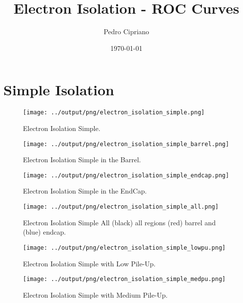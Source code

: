 \documentclass[11pt]{book}
\begin{document}
         
 
 \author{Pedro Cipriano}
 \date{\today}
 \title{Electron Isolation - ROC Curves}

\maketitle

\tableofcontents

\chapter{Simple Isolation}
\begin{figure}[htbp]
\centering
\texttt{[image: ../output/png/electron\_isolation\_simple.png]}
\caption{Electron Isolation Simple.}
\label{fig:electron_isolation_simple}
\end{figure}

\begin{figure}[htbp]
\centering
\texttt{[image: ../output/png/electron\_isolation\_simple\_barrel.png]}
\caption{Electron Isolation Simple in the Barrel.}
\label{fig:electron_isolation_simple_barrel}
\end{figure}

\begin{figure}[htbp]
\centering
\texttt{[image: ../output/png/electron\_isolation\_simple\_endcap.png]}
\caption{Electron Isolation Simple in the EndCap.}
\label{fig:electron_isolation_simple_endcap}
\end{figure}

\begin{figure}[htbp]
\centering
\texttt{[image: ../output/png/electron\_isolation\_simple\_all.png]}
\caption{Electron Isolation Simple All (black) all regions (red) barrel and (blue) endcap.}
\label{fig:electron_isolation_simple_all}
\end{figure}

\begin{figure}[htbp]
\centering
\texttt{[image: ../output/png/electron\_isolation\_simple\_lowpu.png]}
\caption{Electron Isolation Simple with Low Pile-Up.}
\label{fig:electron_isolation_simple_lowpu}
\end{figure}

\begin{figure}[htbp]
\centering
\texttt{[image: ../output/png/electron\_isolation\_simple\_medpu.png]}
\caption{Electron Isolation Simple with Medium Pile-Up.}
\label{fig:electron_isolation_simple_medpu}
\end{figure}
\end{document}
